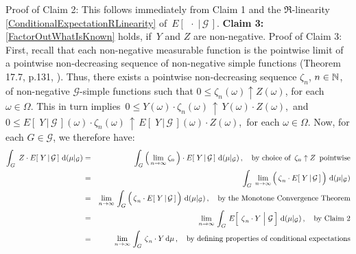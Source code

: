\begin{enumerate}
	\vskip 0.0cm
	Proof of Claim 2: This follows immediately from Claim 1 and
	the $\Re$-linearity \eqref{ConditionalExpectationRLinearity} of \,$E\!\left[\;\,\cdot\;\vert\,\mathcal{G}\,\right]$.
	\vskip 0.4cm
	\textbf{Claim 3:}\;\;\eqref{FactorOutWhatIsKnown} holds, if \,$Y$ and $Z$ are non-negative.
	\vskip 0.0cm
	Proof of Claim 3: First, recall that each non-negative measurable function is the pointwise limit
	of a pointwise non-decreasing sequence of non-negative simple functions (Theorem 17.7, p.131, \cite{Aliprantis1998}).
	Thus, there exists a pointwise non-decreasing sequence $\zeta_{n}$, $n \in \mathbb{N}$, of non-negative
	$\mathcal{G}$-simple functions such that $0 \leq \zeta_{n}(\omega) \uparrow Z(\omega)$, for each $\omega \in \Omega$.
	This in turn implies
	\,$0 \leq Y(\omega) \cdot \zeta_{n}(\omega) \,\uparrow\, Y(\omega) \cdot Z(\omega)$,\,
	and
	\,$0 \leq E\!\left[\;Y\,\vert\,\mathcal{G}\,\right](\omega) \cdot \zeta_{n}(\omega) \,\uparrow\, E\!\left[\;Y\,\vert\,\mathcal{G}\,\right](\omega) \cdot Z(\omega)$,\,
	for each $\omega \in \Omega$.
	Now, for each $G \in \mathcal{G}$, we therefore have:
	\begin{eqnarray*}
	\int_{G}\;Z \cdot E\!\left[\;Y\,\vert\,\mathcal{G}\,\right]\,\d(\mu\vert_{\mathcal{G}})
	&=&
		\int_{G}
			\left(\,\underset{n\rightarrow\infty}{\lim}\,\zeta_{n}\,\right)
			\cdot
			E\!\left[\;Y\,\vert\,\mathcal{G}\,\right]
			\,\d(\mu\vert_{\mathcal{G}})
			\,,\quad\textnormal{by choice of \,$\zeta_{n}\uparrow Z$\, pointwise}
	\\
	&=&
		\int_{G}\;
			\underset{n\rightarrow\infty}{\lim}\left(\,
				\overset{{\color{white}.}}{\zeta}_{n} \cdot E\!\left[\;Y\,\vert\,\mathcal{G}\,\right]
				\,\right)
			\,\d(\mu\vert_{\mathcal{G}})
	\\
	&=&
		\underset{n\rightarrow\infty}{\lim}\,
			\int_{G}\left(\,
				\overset{{\color{white}.}}{\zeta}_{n} \cdot E\!\left[\;Y\,\vert\,\mathcal{G}\,\right]
				\,\right)
			\,\d(\mu\vert_{\mathcal{G}})
			\,,\quad\textnormal{by the Monotone Convergence Theorem}
	\\
	&=&
		\underset{n\rightarrow\infty}{\lim}\,
			\int_{G}\,
				E\!\left[\;\left.\overset{{\color{white}.}}{\zeta}_{n} \cdot Y\;\right\vert\,\mathcal{G}\,\right]
			\,\d(\mu\vert_{\mathcal{G}})
			\,,\quad\textnormal{by Claim 2}
	\\
	&=&
		\underset{n\rightarrow\infty}{\lim}\,
			\int_{G}\,
				\overset{{\color{white}.}}{\zeta}_{n} \cdot Y
			\,\d\mu
			\,,\quad\textnormal{by defining properties of conditional expectations}
	\\

\end{eqnarray*}
\end{enumerate}
